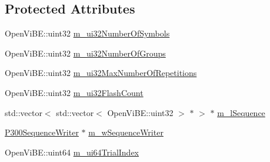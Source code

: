 \subsection*{Protected Attributes}
\begin{DoxyCompactItemize}
\item 
OpenViBE::uint32 \hyperlink{classOpenViBEApplications_1_1P300SequenceGenerator_a73799a32089d8471dd8d27585a204f50}{m\_\-ui32NumberOfSymbols}
\item 
OpenViBE::uint32 \hyperlink{classOpenViBEApplications_1_1P300SequenceGenerator_a08dd649d08d9720bfab1dccb582062bc}{m\_\-ui32NumberOfGroups}
\item 
OpenViBE::uint32 \hyperlink{classOpenViBEApplications_1_1P300SequenceGenerator_a127e878b3eb5bb49dd5aea97ff1b4a16}{m\_\-ui32MaxNumberOfRepetitions}
\item 
OpenViBE::uint32 \hyperlink{classOpenViBEApplications_1_1P300SequenceGenerator_aedc788a8119d3f0fb94a0dcbd63dc21d}{m\_\-ui32FlashCount}
\item 
std::vector$<$ std::vector$<$ OpenViBE::uint32 $>$ $\ast$ $>$ $\ast$ \hyperlink{classOpenViBEApplications_1_1P300SequenceGenerator_a75766827412e3e9c5934387adbca1ec8}{m\_\-lSequence}
\item 
\hyperlink{classOpenViBEApplications_1_1P300SequenceWriter}{P300SequenceWriter} $\ast$ \hyperlink{classOpenViBEApplications_1_1P300SequenceGenerator_a24647523b5cad20e5f8d4ae40251373a}{m\_\-wSequenceWriter}
\item 
OpenViBE::uint64 \hyperlink{classOpenViBEApplications_1_1P300SequenceGenerator_a221d4dda210b33fe4f447313187c833a}{m\_\-ui64TrialIndex}
\end{DoxyCompactItemize}


